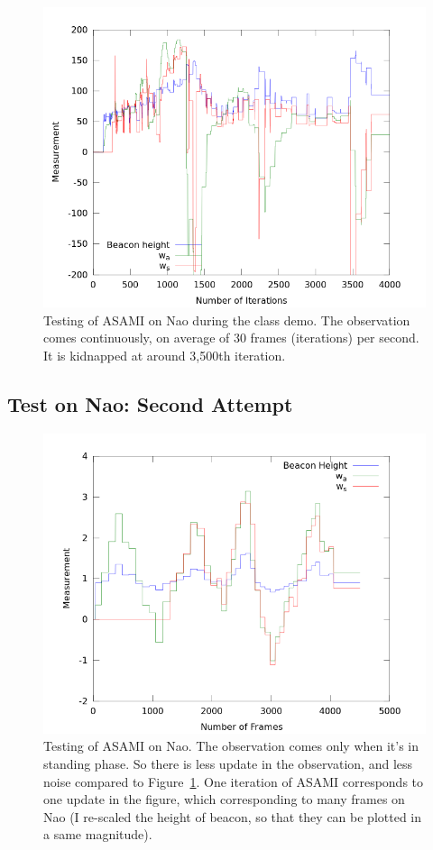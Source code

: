 \documentclass[12pt]{article}
\begin{document}
\begin{figure}[h]
\centering
\includegraphics[width=0.7\columnwidth]{demoResult.png}
\caption{Testing of ASAMI on Nao during the class demo. The
observation comes continuously, on average of 30 frames (iterations)
per second. It is kidnapped at around 3,500th iteration.}
\label{fig:demo}
\end{figure}

\subsection{Test on Nao: Second Attempt}

\begin{figure}[h]
\centering
\includegraphics[width=0.7\columnwidth]{out_obs.png}
\caption{Testing of ASAMI on Nao. The observation comes only when it's
in standing phase. So there is less update in the observation, and
less noise compared to Figure~\ref{fig:demo}. One iteration of ASAMI
corresponds to one update in the figure, which corresponding to many
frames on Nao (I re-scaled the height of beacon, so that they can be
plotted in a same magnitude).}
\label{fig:obs}
\end{figure}
\end{document}
